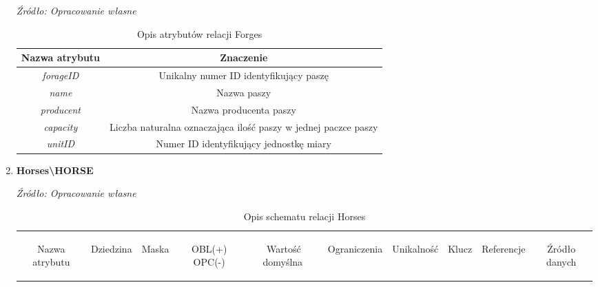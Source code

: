 \documentclass[12pt,oneside]{report}
\begin{document}
\begin{enumerate}[start=1,label={\bfseries REL\textbackslash0\arabic*}]
\begin{table}[H]
	\caption{Opis atrybutów relacji Forges}
	\textit{Źródło: Opracowanie własne}
	\label{ForgesAttributeDescription}
	\centering
	\begin{tabular}{|c|c|}
		\hline
		Nazwa atrybutu & Znaczenie \\
		\hline
		\textit{forageID}&Unikalny numer ID identyfikujący paszę\\		
		\hline		
		\textit{name}&Nazwa paszy\\		
		\hline
		\textit{producent}&Nazwa producenta paszy\\		
		\hline		
		\textit{capacity}&Liczba naturalna oznaczająca ilość paszy w jednej paczce paszy\\		
		\hline
		\textit{unitID}& Numer ID identyfikujący jednostkę miary\\
		\hline
	\end{tabular}
\end{table}
\newpage
\item \textbf{Horses\textbackslash HORSE} 
\begin{table}[H]
	\caption{Opis schematu relacji Horses}
	\textit{Źródło: Opracowanie własne}
	\label{HorsesRelationSchema}
	\centering
	\begin{tabular}{|c|c|c|c|c|c|c|c|c|c|}
		\hline
		\begin{sideways}Nazwa atrybutu\end{sideways}& 
		\begin{sideways}Dziedzina \end{sideways}& 
		\begin{sideways}Maska \end{sideways}& 
		\begin{sideways}OBL(+) OPC(-)\end{sideways} & 
		\begin{sideways}Wartość domyślna$\ $\end{sideways}& 
		\begin{sideways}Ograniczenia\end{sideways} &
		\begin{sideways}Unikalność \end{sideways}& 
		\begin{sideways}Klucz \end{sideways}& 
		\begin{sideways}Referencje \end{sideways}&
		\begin{sideways}Źródło danych\end{sideways}\\

\end{tabular}
\end{table}
\end{enumerate}
\end{document}

